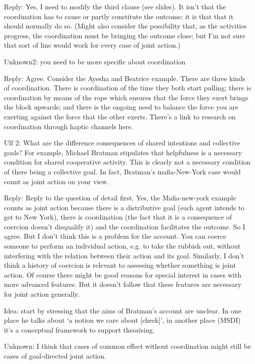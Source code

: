 \documentclass[12pt,a4paper]{extarticle}
\begin{document}
Reply: Yes, I need to modify the third clause (see slides).  It isn't that the coordination has to cause or partly constitute the outcome; it is that that it should normally do so.  (Might also consider the possibility that, as the activities progress, the coordination must be bringing the outcome close; but I'm not sure that sort of line would work for every case of joint action.)


Unknown2: you need to be more specific about coordination

Reply: Agree.  Consider the Ayesha and Beatrice example.  There are three kinds of coordination.  There is coordination of the time they both start pulling; there is coordination by means of the rope which ensures that the force they exert brings the block upwards; and there is the ongoing need to balance the force you are exerting against the force that the other exerts.  There's a link to research on coordination through haptic channels here.


Ulf 2: What are the difference consequences of shared intentions and collective goals?  For example, Michael Bratman stipulates that helpfulness is a necessary condition for shared cooperative activity.  This is clearly not a necessary condition of there being a collective goal.  In fact, Bratman's mafia-New-York case would count as joint action on your view.

Reply: Reply to the question of detail first.  Yes, the Mafia-new-york example counts as joint action because there is a distributive goal (each agent intends to get to New York), there is coordination (the fact that it is a consequence of coercion doesn't disqualify it) and the coordination facilitates the outcome.  So I agree.  But I don't think this is a problem for the account.  You can coerce someone to perform an individual action, e.g. to take the rubbish out, without interfering with the relation between their action and its goal.  Similarly, I don't think a history of coercion is relevant to assessing whether something is joint action.  Of course there might be good reasons for special interest in cases with more advanced features.  But it doesn't follow that these features are necessary for joint action generally.

Idea: start by stressing that the aims of Bratman's account are unclear.  In one place he talks about `a notion we care about [check]', in another place (MSDI) it's a conceptual framework to support theorising.


Unknown: I think that cases of common effect without coordination might still be cases of goal-directed joint action.  
\end{document}
